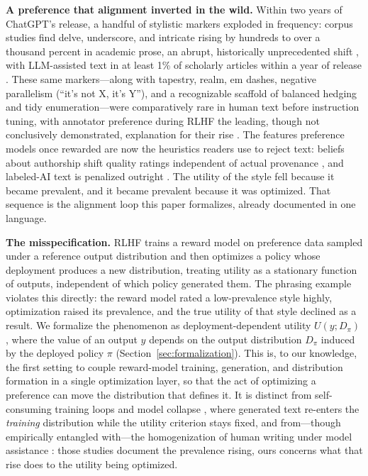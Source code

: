 ﻿\documentclass[11pt]{article}
\begin{document}
\textbf{A preference that alignment inverted in the wild.} Within two years of ChatGPT's release, a handful of stylistic markers exploded in frequency: corpus studies find delve, underscore, and intricate rising by hundreds to over a thousand percent in academic prose, an abrupt, historically unprecedented shift \citep{kobak2025, kousha2025}, with LLM-assisted text in at least 1\% of scholarly articles within a year of release \citep{gray2024}. These same markers---along with tapestry, realm, em dashes, negative parallelism (``it's not X, it's Y''), and a recognizable scaffold of balanced hedging and tidy enumeration---were comparatively rare in human text before instruction tuning, with annotator preference during RLHF the leading, though not conclusively demonstrated, explanation for their rise \citep{juzek2025}. The features preference models once rewarded are now the heuristics readers use to reject text: beliefs about authorship shift quality ratings independent of actual provenance \citep{zhu2025, akpinar2026}, and labeled-AI text is penalized outright \citep{zhu2025}. The utility of the style fell because it became prevalent, and it became prevalent because it was optimized. That sequence is the alignment loop this paper formalizes, already documented in one language.

\textbf{The misspecification.} RLHF trains a reward model on preference data sampled under a reference output distribution and then optimizes a policy whose deployment produces a new distribution, treating utility as a stationary function of outputs, independent of which policy generated them. The phrasing example violates this directly: the reward model rated a low-prevalence style highly, optimization raised its prevalence, and the true utility of that style declined as a result. We formalize the phenomenon as deployment-dependent utility \(U(y; D_\pi)\), where the value of an output \(y\) depends on the output distribution \(D_\pi\) induced by the deployed policy \(\pi\) (Section~\ref{sec:formalization}). This is, to our knowledge, the first setting to couple reward-model training, generation, and distribution formation in a single optimization layer, so that the act of optimizing a preference can move the distribution that defines it. It is distinct from self-consuming training loops and model collapse \citep{shumailov2024, alemohammad2024}, where generated text re-enters the \emph{training} distribution while the utility criterion stays fixed, and from---though empirically entangled with---the homogenization of human writing under model assistance \citep{doshi2024, padmakumar2024}: those studies document the prevalence rising, ours concerns what that rise does to the utility being optimized.
\end{document}
